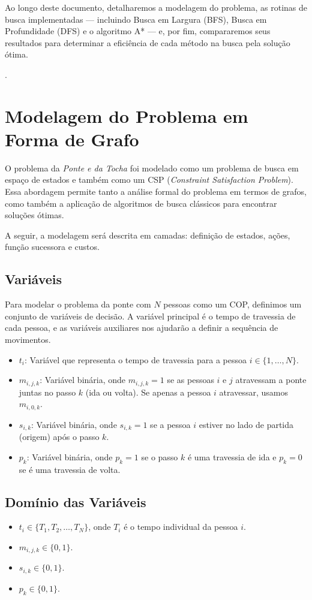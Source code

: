 \documentclass[12pt,a4paper]{article}
\begin{document}
Ao longo deste documento, detalharemos a modelagem do problema, as rotinas de busca implementadas --- incluindo Busca em Largura (BFS), Busca em Profundidade (DFS) e o algoritmo A* --- e, por fim, compararemos seus resultados para determinar a eficiência de cada método na busca pela solução ótima.

\cite{cormen}.

\section{Modelagem do Problema em Forma de Grafo}
O problema da \textit{Ponte e da Tocha} foi modelado como um problema de busca em espaço de estados e também como um CSP (\textit{Constraint Satisfaction Problem}). Essa abordagem permite tanto a análise formal do problema em termos de grafos, como também a aplicação de algoritmos de busca clássicos para encontrar soluções ótimas. 

A seguir, a modelagem será descrita em camadas: definição de estados, ações, função sucessora e custos.

\subsection{Variáveis}
Para modelar o problema da ponte com $N$ pessoas como um COP, definimos um conjunto de variáveis de decisão. A variável principal é o tempo de travessia de cada pessoa, e as variáveis auxiliares nos ajudarão a definir a sequência de movimentos.

\begin{itemize}
    \item $t_i$: Variável que representa o tempo de travessia para a pessoa $i \in \{1, \dots, N\}$.
    \item $m_{i,j,k}$: Variável binária, onde $m_{i,j,k} = 1$ se as pessoas $i$ e $j$ atravessam a ponte juntas no passo $k$ (ida ou volta). Se apenas a pessoa $i$ atravessar, usamos $m_{i,0,k}$.
    \item $s_{i,k}$: Variável binária, onde $s_{i,k} = 1$ se a pessoa $i$ estiver no lado de partida (origem) após o passo $k$.
    \item $p_k$: Variável binária, onde $p_k=1$ se o passo $k$ é uma travessia de ida e $p_k=0$ se é uma travessia de volta.
\end{itemize}

\subsection{Domínio das Variáveis}
\begin{itemize}
    \item $t_i \in \{T_1, T_2, \dots, T_N\}$, onde $T_i$ é o tempo individual da pessoa $i$.
    \item $m_{i,j,k} \in \{0, 1\}$.
    \item $s_{i,k} \in \{0, 1\}$.
    \item $p_k \in \{0, 1\}$.
\end{itemize}
\end{document}
